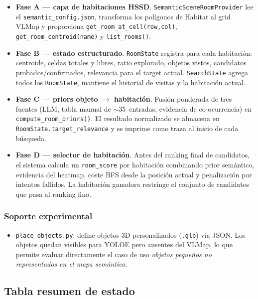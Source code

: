\documentclass[11pt,a4paper]{article}
\begin{document}
\begin{itemize}
  \item[\checkmark] \textbf{Fase A --- capa de habitaciones HSSD}.
        \texttt{SemanticSceneRoomProvider} lee el
        \texttt{semantic\_config.json}, transforma los polígonos de Habitat al
        grid VLMap y proporciona \texttt{get\_room\_at\_cell(row,col)},
        \texttt{get\_room\_centroid(name)} y \texttt{list\_rooms()}.
  \item[\checkmark] \textbf{Fase B --- estado estructurado}. \texttt{RoomState}
        registra para cada habitación: centroide, celdas totales y libres,
        ratio explorado, objetos vistos, candidatos probados/confirmados,
        relevancia para el target actual. \texttt{SearchState} agrega todos
        los \texttt{RoomState}, mantiene el historial de visitas y la
        habitación actual.
  \item[\checkmark] \textbf{Fase C --- priors objeto $\rightarrow$ habitación}.
        Fusión ponderada de tres fuentes (LLM, tabla manual de
        $\sim$35~entradas, evidencia de co-ocurrencia) en
        \texttt{compute\_room\_priors()}. El resultado normalizado se almacena
        en \texttt{RoomState.target\_relevance} y se imprime como traza al
        inicio de cada búsqueda.
  \item[\checkmark] \textbf{Fase D --- selector de habitación}. Antes del
        ranking final de candidatos, el sistema calcula un
        \texttt{room\_score} por habitación combinando prior semántico,
        evidencia del heatmap, coste BFS desde la posición actual y
        penalización por intentos fallidos. La habitación ganadora restringe
        el conjunto de candidatos que pasa al ranking fino.
\end{itemize}

\subsubsection*{Soporte experimental}

\begin{itemize}
  \item[\checkmark] \texttt{place\_objects.py}: define objetos 3D
        personalizados (\texttt{.glb}) vía JSON. Los objetos quedan visibles
        para YOLOE pero ausentes del VLMap, lo que permite evaluar
        directamente el caso de uso \emph{objetos pequeños no representados en
        el mapa semántico}.
\end{itemize}

\subsection{Tabla resumen de estado}
\end{document}
